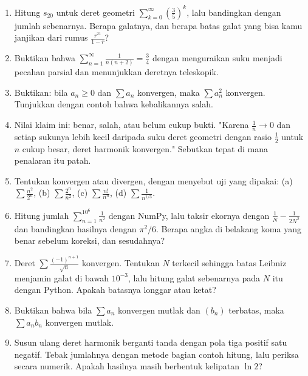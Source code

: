 \begin{latihan}
\begin{enumerate}
\item Hitung $s_{20}$ untuk deret geometri $\sum_{k=0}^{\infty} \left(\frac{3}{5}\right)^k$,
      lalu bandingkan dengan jumlah sebenarnya. Berapa galatnya, dan berapa batas
      galat yang bisa kamu janjikan dari rumus $\frac{r^{21}}{1-r}$?

\item Buktikan bahwa $\sum_{n=1}^{\infty} \frac{1}{n(n+2)} = \frac{3}{4}$ dengan
      menguraikan suku menjadi pecahan parsial dan menunjukkan deretnya teleskopik.

\item Buktikan: bila $a_n \ge 0$ dan $\sum a_n$ konvergen, maka $\sum a_n^2$
      konvergen. Tunjukkan dengan contoh bahwa kebalikannya salah.

\item Nilai klaim ini: benar, salah, atau belum cukup bukti. "Karena
      $\frac{1}{n} \to 0$ dan setiap sukunya lebih kecil daripada suku deret
      geometri dengan rasio $\frac{1}{2}$ untuk $n$ cukup besar, deret harmonik
      konvergen." Sebutkan tepat di mana penalaran itu patah.

\item Tentukan konvergen atau divergen, dengan menyebut uji yang dipakai:
      (a) $\sum \frac{n^2}{2^n}$, (b) $\sum \frac{2^n}{n^2}$,
      (c) $\sum \frac{n!}{n^n}$, (d) $\sum \frac{1}{n^{1/3}}$.

\item Hitung jumlah $\sum_{n=1}^{10^6} \frac{1}{n^2}$ dengan NumPy, lalu taksir
      ekornya dengan $\frac{1}{N} - \frac{1}{2N^2}$ dan bandingkan hasilnya dengan
      $\pi^2/6$. Berapa angka di belakang koma yang benar sebelum koreksi, dan
      sesudahnya?

\item Deret $\sum \frac{(-1)^{n+1}}{\sqrt{n}}$ konvergen. Tentukan $N$ terkecil
      sehingga batas Leibniz menjamin galat di bawah $10^{-3}$, lalu hitung galat
      sebenarnya pada $N$ itu dengan Python. Apakah batasnya longgar atau ketat?

\item Buktikan bahwa bila $\sum a_n$ konvergen mutlak dan $(b_n)$ terbatas, maka
      $\sum a_n b_n$ konvergen mutlak.

\item Susun ulang deret harmonik berganti tanda dengan pola tiga positif satu
      negatif. Tebak jumlahnya dengan metode bagian contoh hitung, lalu periksa
      secara numerik. Apakah hasilnya masih berbentuk kelipatan $\ln 2$?


\end{enumerate}
\end{latihan}
